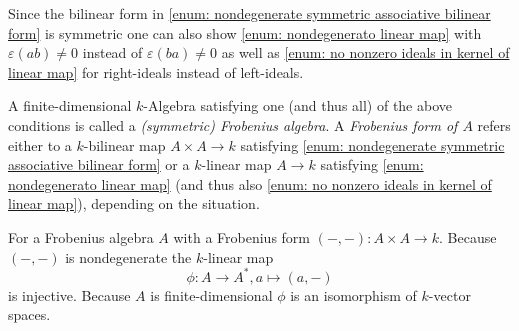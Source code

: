 \begin{rem}
  Since the bilinear form in \ref{enum: nondegenerate symmetric associative bilinear form} is symmetric one can also show \ref{enum: nondegenerato linear map} with $\varepsilon(ab) \neq 0$ instead of $\varepsilon(ba) \neq 0$ as well as \ref{enum: no nonzero ideals in kernel of linear map} for right-ideals instead of left-ideals.
\end{rem}


\begin{defi}
  A finite-dimensional $k$-Algebra satisfying one (and thus all) of the above conditions is called a \emph{(symmetric) Frobenius algebra}.
  A \emph{Frobenius form of $A$} refers either to a $k$-bilinear map $A \times A \to k$ satisfying \ref{enum: nondegenerate symmetric associative bilinear form} or a $k$-linear map $A \to k$ satisfying \ref{enum: nondegenerato linear map} (and thus also \ref{enum: no nonzero ideals in kernel of linear map}), depending on the situation.
\end{defi}


\begin{rem}
  For a Frobenius algebra $A$ with a Frobenius form $(-,-) \colon A \times A \to k$.
  Because $(-,-)$ is nondegenerate the $k$-linear map
  \[
            \phi
    \colon  A
    \to     A^*,
            a
    \mapsto (a,-)
  \]
  is injective.
  Because $A$ is finite-dimensional $\phi$ is an isomorphism of $k$-vector spaces.
\end{rem}


